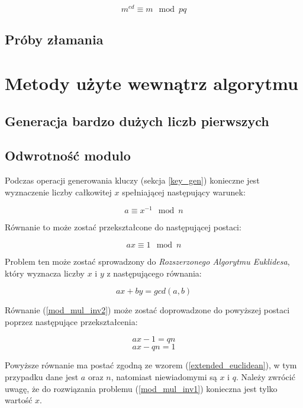 \documentclass[10pt,a4paper]{article}
\begin{document}
\begin{equation}
m^{ed} \equiv m \mod pq
\end{equation}

\subsection{Próby złamania}

\section{Metody użyte wewnątrz algorytmu}
\subsection{Generacja bardzo dużych liczb pierwszych}
\subsection{Odwrotność modulo} \label{mod_inv}
Podczas operacji generowania kluczy (sekcja \ref{key_gen}) konieczne jest wyznaczenie liczby całkowitej $x$ spełniającej następujący warunek:

\begin{equation} 
\label{mod_mul_inv1}
a \equiv x^{-1} \mod n
\end{equation}

Równanie to może zostać przekształcone do następującej postaci:

\begin{equation}
\label{mod_mul_inv2}
ax \equiv 1 \mod n
\end{equation}

Problem ten może zostać sprowadzony do \textit{Rozszerzonego Algorytmu Euklidesa}, który wyznacza liczby $x$ i $y$ z następującego równania:

\begin{equation}
\label{extended_euclidean}
ax + by = gcd(a,b)
\end{equation}

Równanie (\ref{mod_mul_inv2}) może zostać doprowadzone do powyższej postaci poprzez następujące przekształcenia:

\begin{equation}
ax - 1 = qn
\end{equation}
\begin{equation}
ax - qn = 1
\end{equation}

Powyższe równanie ma postać zgodną ze wzorem (\ref{extended_euclidean}), w tym przypadku dane jest $a$ oraz $n$, natomiast niewiadomymi są $x$ i $q$. Należy zwrócić uwagę, że do rozwiązania problemu (\ref{mod_mul_inv1}) konieczna jest tylko wartość $x$.\\
\end{document}
